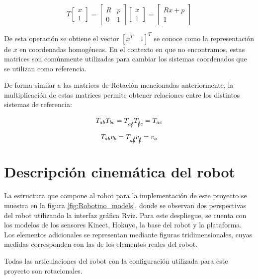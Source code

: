\begin{equation*}
    T \begin{bmatrix}
        x\\1
    \end{bmatrix} = 
    \begin{bmatrix}
	R & p\\
	0 & 1 
	\end{bmatrix}
    \begin{bmatrix}
	x\\
	1 
	\end{bmatrix}=
    \begin{bmatrix}
	Rx + p\\
    1 
	\end{bmatrix}
\end{equation*}

De esta operación se obtiene el vector $ \left[x^{T}\quad 1\right]^{T}$ se conoce como la representación de $x$ en coordenadas homogéneas. En el contexto en que no encontramos, estas matrices son comúnmente utilizadas para cambiar los sistemas coordenados que se utilizan como referencia. 

De forma similar a las matrices de Rotación mencionadas anteriormente, la multiplicación de estas matrices permite obtener relaciones entre los distintos sistemas de referencia:

\begin{equation*}
    T_{ab}T_{bc} = T_{a\cancel{b}}T_{\cancel{b}c}=T_{ac}
\end{equation*}

\begin{equation*}
    T_{ab}v_{b} = T_{a\cancel{b}}v_{\cancel{b}}=v_{a}
\end{equation*}

\section{Descripción cinemática del robot}

La estructura que compone al robot para la implementación de este proyecto se muestra en la figura \ref{fig:Robotino_models}, donde se observan dos perspectivas del robot utilizando la interfaz gráfica Rviz. Para este despliegue, se cuenta con los modelos de los sensores Kinect, Hokuyo, la base del robot y la plataforma. Los elementos adicionales se representan mediante figuras tridimensionales, cuyas medidas corresponden con las de los elementos reales del robot.

Todas las articulaciones del robot con la configuración utilizada para este proyecto son rotacionales.

